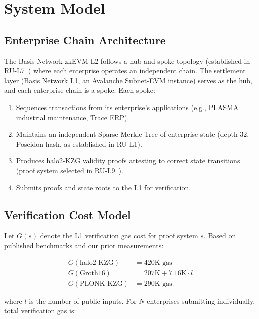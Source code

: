 \section{System Model}
\label{sec:system-model}

\subsection{Enterprise Chain Architecture}

The Basis Network zkEVM L2 follows a hub-and-spoke topology (established
in RU-L7~\cite{rul7-hub-spoke}) where each enterprise operates an
independent chain. The settlement layer (Basis Network L1, an Avalanche
Subnet-EVM instance) serves as the hub, and each enterprise chain is a
spoke. Each spoke:

\begin{enumerate}
  \item Sequences transactions from its enterprise's applications
    (e.g., PLASMA industrial maintenance, Trace ERP).
  \item Maintains an independent Sparse Merkle Tree of enterprise state
    (depth 32, Poseidon hash, as established in RU-L1).
  \item Produces halo2-KZG validity proofs attesting to correct state
    transitions (proof system selected in RU-L9~\cite{rul9-plonk}).
  \item Submits proofs and state roots to the L1 for verification.
\end{enumerate}

\subsection{Verification Cost Model}

Let $G(s)$ denote the L1 verification gas cost for proof system $s$.
Based on published benchmarks and our prior measurements:

\begin{align}
  G(\text{halo2-KZG}) &= 420\text{K gas} \label{eq:halo2-gas} \\
  G(\text{Groth16}) &= 207\text{K} + 7.16\text{K} \cdot l \label{eq:groth16-gas} \\
  G(\text{PLONK-KZG}) &= 290\text{K gas} \label{eq:plonk-gas}
\end{align}

\noindent where $l$ is the number of public inputs. For $N$ enterprises
submitting individually, total verification gas is:

